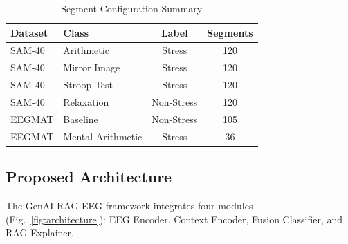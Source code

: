 \documentclass[journal,twoside]{IEEEtran}
\begin{document}
\begin{table}[t]
\centering
\caption{Segment Configuration Summary}
\label{tab:segments}
\scriptsize
\begin{tabular}{llcc}
\toprule
\textbf{Dataset} & \textbf{Class} & \textbf{Label} & \textbf{Segments} \\
\midrule
SAM-40 & Arithmetic & Stress & 120 \\
SAM-40 & Mirror Image & Stress & 120 \\
SAM-40 & Stroop Test & Stress & 120 \\
SAM-40 & Relaxation & Non-Stress & 120 \\
\midrule
EEGMAT & Baseline & Non-Stress & 105 \\
EEGMAT & Mental Arithmetic & Stress & 36 \\
\bottomrule
\end{tabular}
\end{table}

\subsection{Proposed Architecture}

The GenAI-RAG-EEG framework integrates four modules (Fig.~\ref{fig:architecture}): EEG Encoder, Context Encoder, Fusion Classifier, and RAG Explainer.
\end{document}
